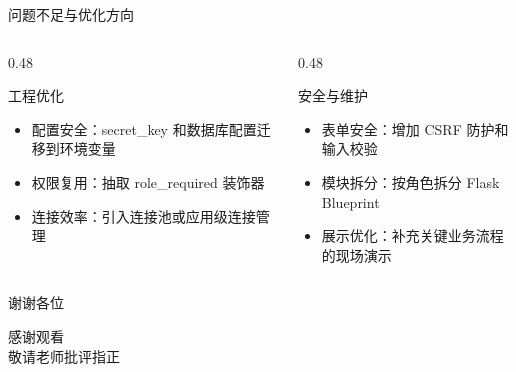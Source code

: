 \documentclass{beamer}
\newcommand{\smallitems}{\setlength{\itemsep}{0.18em}\footnotesize}
\begin{document}
\begin{frame}{问题不足与优化方向}
  \begin{columns}[T]
    \begin{column}{0.48\textwidth}
      \begin{block}{工程优化}
        \smallitems
        \begin{itemize}
          \item 配置安全：secret\_key 和数据库配置迁移到环境变量
          \item 权限复用：抽取 role\_required 装饰器
          \item 连接效率：引入连接池或应用级连接管理
        \end{itemize}
      \end{block}
    \end{column}
    \begin{column}{0.48\textwidth}
      \begin{block}{安全与维护}
        \smallitems
        \begin{itemize}
          \item 表单安全：增加 CSRF 防护和输入校验
          \item 模块拆分：按角色拆分 Flask Blueprint
          \item 展示优化：补充关键业务流程的现场演示
        \end{itemize}
      \end{block}
    \end{column}
  \end{columns}
\end{frame}

\begin{frame}{谢谢各位}
  \begin{center}
    \vspace{2.0cm}
    {\Large 感谢观看}\\[0.8cm]
    {\large 敬请老师批评指正}
  \end{center}
\end{frame}
\end{document}
